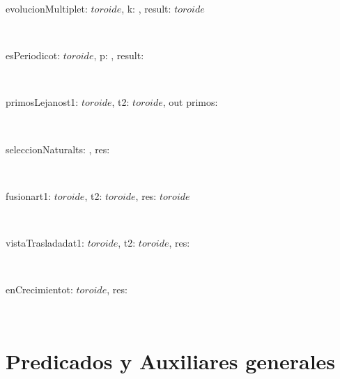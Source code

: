 \documentclass[a4paper]{article}
\begin{document}
	    \begin{proc}{evolucionMultiple}{\Inout t: $toroide$, \In k: \ent, \Out result: $toroide$}{}
    		\post{}
    	\end{proc} \\
    	
    	\begin{proc}{esPeriodico}{\In t: $toroide$, \Inout p: \ent, \Out result: \bool}{}
    		\post{} %
    	\end{proc} \\
    	
    	\begin{proc}{primosLejanos}{\In t1: $toroide$, \In t2: $toroide$, out primos: \bool}{}
    		\post{}
    	\end{proc} \\
    	
    	\begin{proc}{seleccionNatural}{\In ts: , \Out res: \ent}{}
    		\post{}
    	\end{proc} \\
    	
    	\begin{proc}{fusionar}{\In t1: $toroide$, \In t2: $toroide$, \Out res: $toroide$}{}
    	\end{proc} \\
	
	    \begin{proc}{vistaTrasladada}{\In t1: $toroide$, \In t2: $toroide$, \Out res: \bool}{}
    		\post{}
    	\end{proc} \\
    	
    	\begin{proc}{enCrecimiento}{\In t: $toroide$, \Out res: \bool}{}
    		\post{}
    	\end{proc} \\
	
	\section{Predicados y Auxiliares generales}
	
\end{document}
